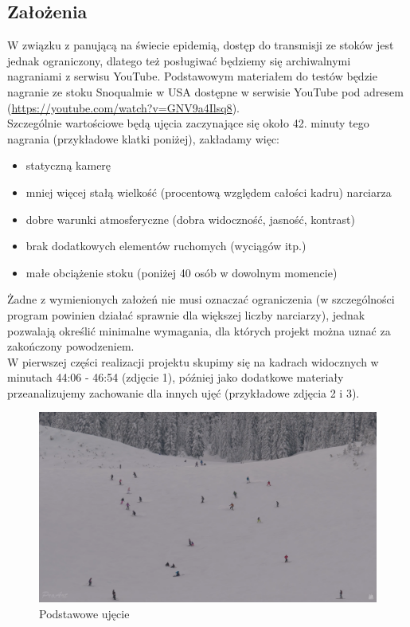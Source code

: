 \documentclass[a4paper]{article}
\begin{document}
\subsection{Założenia}
W związku z panującą na świecie epidemią, dostęp do transmisji ze stoków jest jednak ograniczony, dlatego też posługiwać będziemy się archiwalnymi nagraniami z serwisu YouTube. Podstawowym materiałem do testów będzie nagranie ze stoku Snoqualmie w USA dostępne w serwisie YouTube pod adresem (\url{https://youtube.com/watch?v=GNV9a4Ilsq8}).\\ Szczególnie wartościowe będą ujęcia zaczynające się około 42. minuty tego nagrania (przykładowe klatki poniżej), zakładamy więc:
\begin{itemize}
\item statyczną kamerę
\item mniej więcej stałą wielkość (procentową względem całości kadru) narciarza
\item dobre warunki atmosferyczne (dobra widoczność, jasność, kontrast)
\item brak dodatkowych elementów ruchomych (wyciągów itp.)
\item małe obciążenie stoku (poniżej 40 osób w dowolnym momencie)
\end{itemize}
Żadne z wymienionych założeń nie musi oznaczać ograniczenia (w szczególności program powinien działać sprawnie dla większej liczby narciarzy), jednak pozwalają określić minimalne wymagania, dla których projekt można uznać za zakończony powodzeniem.\\
W pierwszej części realizacji projektu skupimy się na kadrach widocznych w minutach 44:06 - 46:54 (zdjęcie 1), później jako dodatkowe materiały przeanalizujemy zachowanie dla innych ujęć (przykładowe zdjęcia 2 i 3).
\begin{figure}
  \includegraphics[width=\linewidth]{resources/img1.png}
  \caption{Podstawowe ujęcie}
\end{figure}
\end{document}
